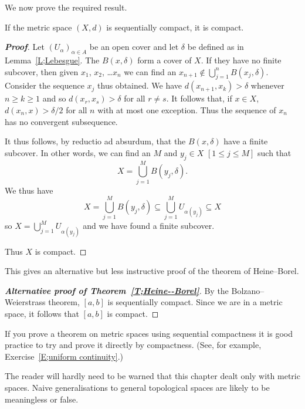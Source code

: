 We now prove the required result.

\begin{theorem}\label{T;sequence implies compact}
If the metric space $(X,d)$ is sequentially compact, it is compact.
\end{theorem}
\begin{proof}[\bf Proof] Let $(U_{\alpha})_{\alpha\in A}$ be an open cover
and let $\delta$ be defined as in Lemma~\ref{L;Lebesgue}.
The $B(x,\delta)$ form a cover of $X$. If they have no finite
subcover, then given $x_{1}$, $x_{2}$, \dots $x_{n}$
we can find an $x_{n+1}\notin\bigcup_{j=1}^{n}B(x_{j},\delta)$. 
Consider the sequence $x_{j}$ thus obtained.
We have $d(x_{n+1},x_{k})>\delta$ whenever $n\geq k\geq 1$
and so $d(x_{r},x_{s})>\delta$ for all $r\neq s$.
It follows that, if $x\in X$, $d(x_{n},x)>\delta/2$
for all $n$ with at most one exception. Thus
the sequence of $x_{n}$ has no convergent subsequence.

It thus follows, by reductio ad absurdum, that the
$B(x,\delta)$ have a finite subcover. In other words,
we can find
an $M$ and $y_{j}\in X$ $[1\leq j\leq M]$ such that
\[X=\bigcup_{j=1}^{M}B(y_{j},\delta).\]
We thus have
\[X=\bigcup_{j=1}^{M}B(y_{j},\delta)
\subseteq \bigcup_{j=1}^{M}U_{\alpha(y_{j})}\subseteq X\]
so $X=\bigcup_{j=1}^{M}U_{\alpha(y_{j})}$ and we have
found a finite subcover.

Thus $X$ is compact.
\end{proof}

This gives an alternative but less instructive
proof of the theorem of Heine--Borel.

\begin{proof}[\bf Alternative proof of Theorem~\ref{T;Heine--Borel}]%
\label{Alternative Heine--Borel}
By the Bolzano--Weierstrass theorem, $[a,b]$ is
sequentially compact. Since we are in a metric space,
it follows that $[a,b]$ is compact.
\end{proof}


If you prove a theorem on metric spaces using
sequential compactness it is good practice to
try and prove it directly by compactness.
(See, for example,
Exercise~\ref{E;uniform continuity}.)

The reader will hardly need to be warned that this chapter
dealt only with metric spaces. Naive generalisations
to general topological spaces are likely to be meaningless
or false.











